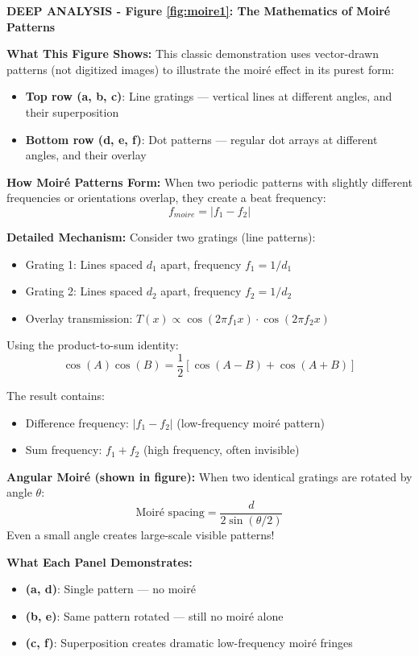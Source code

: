 \documentclass[12pt,a4paper]{article}
\begin{document}
\begin{deepexplanation}
\textbf{DEEP ANALYSIS - Figure \ref{fig:moire1}: The Mathematics of Moiré Patterns}

\textbf{What This Figure Shows:}
This classic demonstration uses vector-drawn patterns (not digitized images) to illustrate the moiré effect in its purest form:
\begin{itemize}
    \item \textbf{Top row (a, b, c)}: Line gratings --- vertical lines at different angles, and their superposition
    \item \textbf{Bottom row (d, e, f)}: Dot patterns --- regular dot arrays at different angles, and their overlay
\end{itemize}

\textbf{How Moiré Patterns Form:}
When two periodic patterns with slightly different frequencies or orientations overlap, they create a beat frequency:
\[
f_{moire} = |f_1 - f_2|
\]

\textbf{Detailed Mechanism:}
Consider two gratings (line patterns):
\begin{itemize}
    \item Grating 1: Lines spaced $d_1$ apart, frequency $f_1 = 1/d_1$
    \item Grating 2: Lines spaced $d_2$ apart, frequency $f_2 = 1/d_2$
    \item Overlay transmission: $T(x) \propto \cos(2\pi f_1 x) \cdot \cos(2\pi f_2 x)$
\end{itemize}

Using the product-to-sum identity:
\[
\cos(A)\cos(B) = \frac{1}{2}[\cos(A-B) + \cos(A+B)]
\]

The result contains:
\begin{itemize}
    \item Difference frequency: $|f_1 - f_2|$ (low-frequency moiré pattern)
    \item Sum frequency: $f_1 + f_2$ (high frequency, often invisible)
\end{itemize}

\textbf{Angular Moiré (shown in figure):}
When two identical gratings are rotated by angle $\theta$:
\[
\text{Moiré spacing} = \frac{d}{2\sin(\theta/2)}
\]
Even a small angle creates large-scale visible patterns!

\textbf{What Each Panel Demonstrates:}
\begin{itemize}
    \item \textbf{(a, d)}: Single pattern --- no moiré
    \item \textbf{(b, e)}: Same pattern rotated --- still no moiré alone
    \item \textbf{(c, f)}: Superposition creates dramatic low-frequency moiré fringes
\end{itemize}
\end{deepexplanation}
\end{document}
